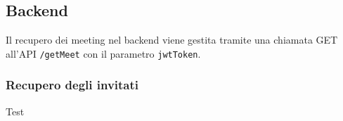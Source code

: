\subsection{Backend}
Il recupero dei meeting nel backend viene gestita tramite una chiamata 
GET all'API \texttt{\//getMeet} con il parametro \texttt{jwtToken}.

\clearpage


\subsubsection{Recupero degli invitati}
Test
